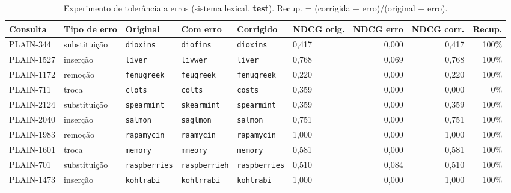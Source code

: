 \begin{table}[t]
\centering
\caption{Experimento de tolerância a erros (sistema lexical, \textbf{test}). Recup. = (corrigida $-$ erro)/(original $-$ erro).}
\label{tab:typo}
\scriptsize
\begin{tabular}{llllllrrr}
\toprule
Consulta & Tipo de erro & Original & Com erro & Corrigido & NDCG orig. & NDCG erro & NDCG corr. & Recup. \\
\midrule
PLAIN-344 & substituição & \texttt{dioxins} & \texttt{diofins} & \texttt{dioxins} & 0,417 & 0,000 & 0,417 & 100\% \\
PLAIN-1527 & inserção & \texttt{liver} & \texttt{livwer} & \texttt{liver} & 0,768 & 0,069 & 0,768 & 100\% \\
PLAIN-1172 & remoção & \texttt{fenugreek} & \texttt{feugreek} & \texttt{fenugreek} & 0,220 & 0,000 & 0,220 & 100\% \\
PLAIN-711 & troca & \texttt{clots} & \texttt{colts} & \texttt{costs} & 0,359 & 0,000 & 0,000 & 0\% \\
PLAIN-2124 & substituição & \texttt{spearmint} & \texttt{skearmint} & \texttt{spearmint} & 0,359 & 0,000 & 0,359 & 100\% \\
PLAIN-2040 & inserção & \texttt{salmon} & \texttt{saglmon} & \texttt{salmon} & 0,751 & 0,000 & 0,751 & 100\% \\
PLAIN-1983 & remoção & \texttt{rapamycin} & \texttt{raamycin} & \texttt{rapamycin} & 1,000 & 0,000 & 1,000 & 100\% \\
PLAIN-1601 & troca & \texttt{memory} & \texttt{mmeory} & \texttt{memory} & 0,581 & 0,000 & 0,581 & 100\% \\
PLAIN-701 & substituição & \texttt{raspberries} & \texttt{raspberrieh} & \texttt{raspberries} & 0,510 & 0,084 & 0,510 & 100\% \\
PLAIN-1473 & inserção & \texttt{kohlrabi} & \texttt{kohlrrabi} & \texttt{kohlrabi} & 1,000 & 0,000 & 1,000 & 100\% \\
\bottomrule
\end{tabular}
\end{table}
